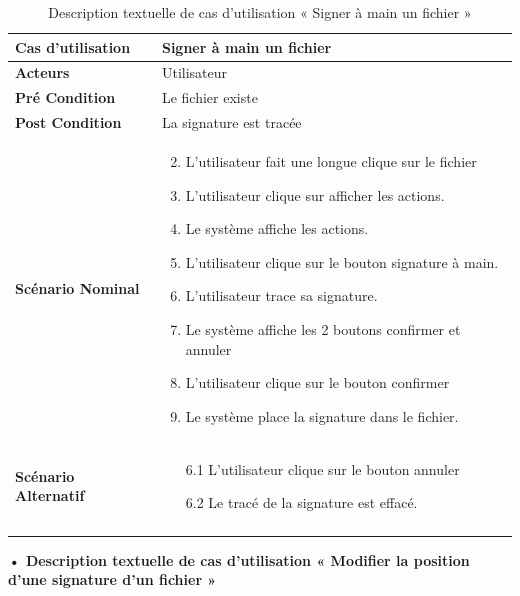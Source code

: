 \begin{longtable}{|p{5cm}|p{10cm}|}
\hline
\textbf{Cas d'utilisation}&Signer à main un fichier\\
\hline
\textbf{Acteurs}&Utilisateur\\
\hline
\textbf{Pré Condition}&Le fichier existe\\
\hline
\textbf{Post Condition}&La signature est tracée\\
\hline
\textbf{Scénario Nominal}&
\vspace{-\baselineskip}
\begin{enumerate}
    \setcounter{enumi}{1}
  \item L'utilisateur fait une longue clique sur le fichier
  \item L'utilisateur clique sur afficher les actions.
  \item Le système affiche les actions.
  \item L'utilisateur clique sur le bouton signature à main.
  \item L'utilisateur trace sa signature.
  \item Le système affiche les 2 boutons confirmer et annuler
  \item L'utilisateur clique sur le bouton confirmer
  \item Le système place la signature dans le fichier.
\end{enumerate}\\
\hline
\textbf{Scénario Alternatif}&
\vspace{-\baselineskip}
\begin{enumerate}
    \item [6.1]L'utilisateur clique sur le bouton annuler
    \item [6.2]Le tracé de la signature est effacé.
\end{enumerate}\\
\hline
\caption{Description textuelle de cas d'utilisation « Signer à main un fichier »}
\label{tab:description-textuelle-de-cas-d-utilisation-signer-a-main-un-fichier}
\end{longtable}


\textbf{•	Description textuelle de cas d'utilisation « Modifier la position d'une signature d'un fichier »}

